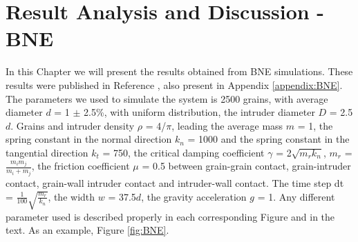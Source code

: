 
\chapter{Result Analysis and Discussion - BNE}
\label{chap:Resultados-BNE}

    In this Chapter we will present the results obtained from BNE simulations. These results were published in Reference \cite{Large-deviation_quantification_of_boundary_conditions_on_the_Brazil_nut_effect}, also present in Appendix \ref{appendix:BNE}. The parameters we used to simulate the system is 2500 grains, with average diameter $d$ = 1 $\pm$ 2.5\%, with uniform distribution, the intruder diameter $D$ = 2.5$d$. Grains and intruder density $\rho$ = 4/$\pi$, leading the average mass $m$ = 1, the spring constant in the normal direction $k_{n}$ = 1000 and the spring constant in the tangential direction $k_{t}$ = 750, the critical damping coefficient $\gamma$ = 2$\sqrt{m_r k_{n}}$, $m_r$ = $\frac{m_i m_j}{m_i + m_j}$, the friction coefficient $\mu$ = 0.5 between grain-grain contact, grain-intruder contact, grain-wall intruder contact and intruder-wall contact. The time step dt = $\frac{1}{100}\sqrt{\frac{m_r}{k_n}}$, the width $w$ = 37.5$d$, the gravity acceleration $g$ = 1. Any different parameter used is described properly in each corresponding Figure and in the text. As an example, Figure \ref{fig:BNE}.


